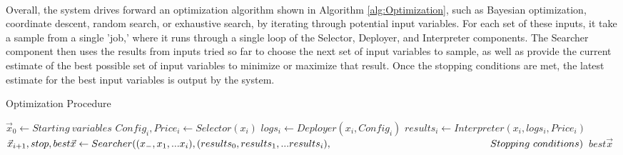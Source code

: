 \documentclass{report}
\begin{document}
\paragraph{}
Overall, the system drives forward an optimization algorithm shown in Algorithm \ref{alg:Optimization}, such as Bayesian optimization, coordinate descent, random search, or exhaustive search, by iterating through potential input variables. For each set of these inputs, it take a sample from a single 'job,' where it runs through a single loop of the Selector, Deployer, and Interpreter components. The Searcher component then uses the results from inputs tried so far to choose the next set of input variables to sample, as well as provide the current estimate of the best possible set of input variables to minimize or maximize that result. Once the stopping conditions are met, the latest estimate for the best input variables is output by the system.

\begin{algorithm}
\caption{Optimization Procedure}
\label{alg:Optimization}
\begin{algorithmic}
\State $\vec{x}_{0}\gets Starting \ variables$
\State $Config_i, Price_i\gets Selector(x_i)$
\State $logs_i \gets Deployer(x_i, Config_i)$
\State $results_i \gets Interpreter(x_i, logs_i, Price_i)$
\State $\vec{x}_{i+1}, stop, best\vec{x} \gets Searcher((x_-, x_1,...x_i), (results_0, results_1,...results_i),\newline
\hspace*{5.6cm}Stopping\ conditions)$
\State \Return $best\vec{x}$
\EndIf
\EndFor
\EndProcedure
\end{algorithmic}
\end{algorithm}
 
\end{document}
